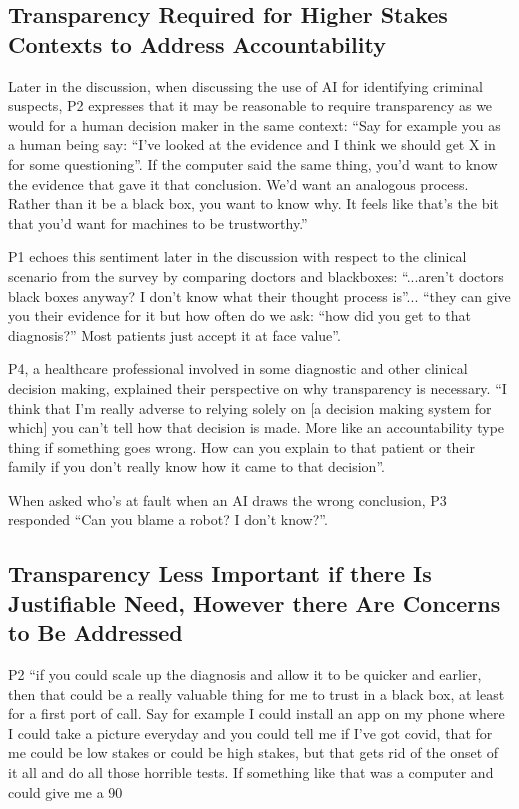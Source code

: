 \documentclass[manuscript,screen,review]{acmart}
\begin{document}
\subsection{Transparency Required for Higher Stakes Contexts to Address Accountability}
Later in the discussion, when discussing the use of AI for identifying criminal suspects, P2 expresses that it may be reasonable to require transparency as we would for a human decision maker in the same context:  “Say for example you as a human being say: “I've looked at the evidence and I think we should get X in for some questioning”. If the computer said the same thing, you'd want to know the evidence that gave it that conclusion. We'd want an analogous process. Rather than it be a black box, you want to know why. It feels like that’s the bit that you'd want for machines to be trustworthy.”

P1 echoes this sentiment later in the discussion with respect to the clinical scenario from the survey by comparing doctors and blackboxes: “...aren’t doctors black boxes anyway? I don’t know what their thought process is”... “they can give you their evidence for it but how often do we ask: “how did you get to that diagnosis?” Most patients just accept it at face value”. 

P4, a healthcare professional involved in some diagnostic and other clinical decision making, explained their perspective on why transparency is necessary. “I think that I'm really adverse to relying solely on [a decision making system for which] you can't tell how that decision is made. More like an accountability type thing if something goes wrong. How can you explain to that patient or their family if you don’t really know how it came to that decision”. 

When asked who’s at fault when an AI draws the wrong conclusion, P3 responded “Can you blame a robot? I don’t know?”.


\subsection{Transparency Less Important if there Is Justifiable Need, However there Are Concerns to Be Addressed}

P2 “if you could scale up the diagnosis and allow it to be quicker and earlier, then that could be a really valuable thing for me to trust in a black box, at least for a first port of call. Say for example I could install an app on my phone where I could take a picture everyday and you could tell me if I've got covid, that for me could be low stakes or could be high stakes, but that gets rid of the onset of it all and do all those horrible tests. If something like that was a computer and could give me a 90%
\end{document}
